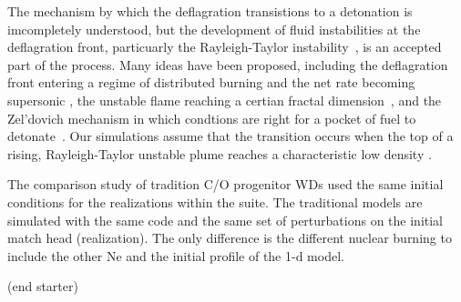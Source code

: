 \documentclass[iop,apj]{emulateapj}
\begin{document}
The mechanism by which the deflagration transistions to a detonation
is imcompletely understood, but the development of fluid instabilities
at the deflagration front, particuarly the Rayleigh-Taylor 
instability~\cite{}, is an accepted part of the process.
Many ideas have been proposed, including the deflagration front
entering a regime of distributed burning and the net
rate becoming supersonic \cite{NiemWoos97}, the unstable
flame reaching a certian fractal dimension~\cite{woosley90},
and the Zel'dovich mechanism in which condtions are right for
a pocket of fuel to 
detonate~\cite{zeldovichetal1970,KhokOranWhee97,jacketal2014}.
Our simulations assume that the transition occurs when the top of a 
rising, Rayleigh-Taylor unstable plume reaches a characteristic low
density \cite{townsley.calder.ea:flame}.

The comparison study of tradition C/O progenitor WDs used the same initial
conditions for the realizations within the suite. The traditional models
are simulated with the same code and the same set of perturbations on the
initial match head (realization). The only difference is the different
nuclear burning to include the other Ne and the initial profile of the
1-d model. 

(end starter)

%
%
%
%
%
%
%
%
%
\end{document}

